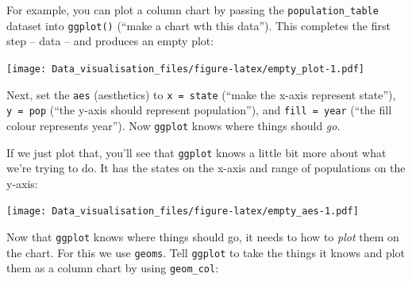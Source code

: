 \documentclass[]{book}
\newenvironment{Shaded}{\begin{snugshade}}{\end{snugshade}}
\newcommand{\DataTypeTok}[1]{\textcolor[rgb]{0.13,0.29,0.53}{#1}}
\newcommand{\KeywordTok}[1]{\textcolor[rgb]{0.13,0.29,0.53}{\textbf{#1}}}
\newcommand{\NormalTok}[1]{#1}
\newcommand{\OperatorTok}[1]{\textcolor[rgb]{0.81,0.36,0.00}{\textbf{#1}}}
\newcommand{\StringTok}[1]{\textcolor[rgb]{0.31,0.60,0.02}{#1}}
\begin{document}
For example, you can plot a column chart by passing the \texttt{population\_table} dataset into \texttt{ggplot()} (``make a chart wth this data''). This completes the first step -- data -- and produces an empty plot:

\begin{Shaded}
\end{Shaded}

\texttt{[image: Data\_visualisation\_files/figure-latex/empty\_plot-1.pdf]}

Next, set the \texttt{aes} (aesthetics) to \texttt{x\ =\ state} (``make the x-axis represent state''), \texttt{y\ =\ pop} (``the y-axis should represent population''), and \texttt{fill\ =\ year} (``the fill colour represents year''). Now \texttt{ggplot} knows where things should \emph{go}.

If we just plot that, you'll see that \texttt{ggplot} knows a little bit more about what we're trying to do. It has the states on the x-axis and range of populations on the y-axis:

\begin{Shaded}
\end{Shaded}

\texttt{[image: Data\_visualisation\_files/figure-latex/empty\_aes-1.pdf]}

Now that \texttt{ggplot} knows where things should go, it needs to how to \emph{plot} them on the chart. For this we use \texttt{geoms}. Tell \texttt{ggplot} to take the things it knows and plot them as a column chart by using \texttt{geom\_col}:

\begin{Shaded}
\end{Shaded}
\end{document}
